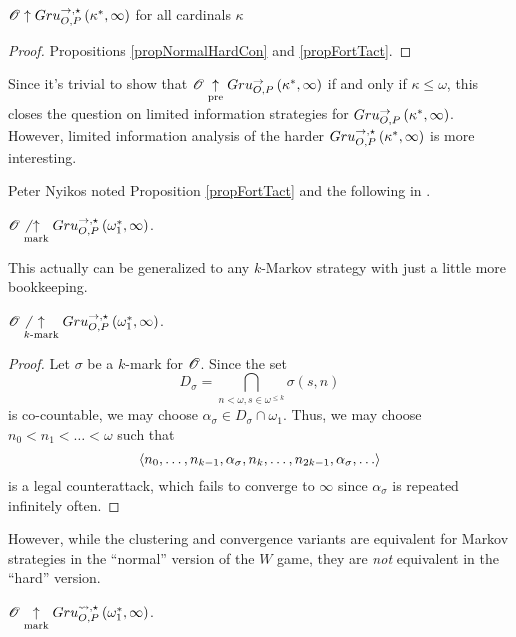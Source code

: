\begin{cor}
  $\mathscr{O} \uparrow Gru_{O,P}^{\to,\star}\left({\kappa^*},{\infty}\right)$ for all cardinals $\kappa$
\end{cor}

\begin{proof}
  Propositions \ref{propNormalHardCon} and \ref{propFortTact}.
\end{proof}

Since it's trivial to show that
$\mathscr{O}\underset{\text{pre}}{\uparrow}Gru_{O,P}^{\to}\left({\kappa^*},{\infty}\right)$ if and
only if $\kappa\leq\omega$, this closes the question on limited information
strategies for $Gru_{O,P}^{\to}\left({\kappa^*},{\infty}\right)$. However, limited
information analysis of the harder $Gru_{O,P}^{\to,\star}\left({\kappa^*},{\infty}\right)$
is more interesting.

Peter Nyikos noted Proposition \ref{propFortTact} and the following in
\cite{MR1031771}.

\begin{thm}
  $\mathscr{O} \not\underset{\text{mark}}{\uparrow} Gru_{O,P}^{\to,\star}\left({\omega^*_1},{\infty}\right)$.
\end{thm}

This actually can be generalized to any $k$-Markov strategy with just
a little more bookkeeping.

\begin{thm}
  $\mathscr{O} \not\underset{k\text{-mark}}{\uparrow} Gru_{O,P}^{\to,\star}\left({\omega^*_1},{\infty}\right)$.
\end{thm}

\begin{proof}
  Let $\sigma$ be a $k$-mark for $\mathscr{O}$. Since the set
    \[
      D_\sigma
        =
      \bigcap_{n<\omega,s\in \omega^{\leq k}}
      \sigma(s,n)
    \]
  is co-countable, we may choose $\alpha_\sigma\in D_\sigma\cap\omega_1$.
  Thus, we may choose $n_0<n_1<\dots<\omega$ such that
    \[
      \<n_0,\dots,n_{k-1},\alpha_\sigma,
        n_k,\dots,n_{2k-1},\alpha_\sigma,
        \dots\>
    \]
  is a legal counterattack, which fails to converge to $\infty$ since
  $\alpha_\sigma$ is repeated infinitely often.
\end{proof}

However, while the clustering and convergence variants are equivalent
for Markov strategies in the ``normal'' version of the $W$ game, they are
\textit{not} equivalent in the ``hard'' version.

\begin{thm}
  $\mathscr{O}\underset{\text{mark}}{\uparrow} Gru_{O,P}^{\leadsto,\star}\left({\omega^*_1},{\infty}\right)$.
\end{thm}


